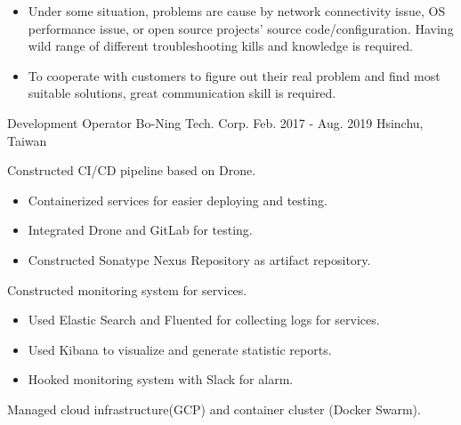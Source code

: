 \begin{cventries}
{\begin{cvitems}
{\begin{itemize}
                            \item Under some situation, problems are cause by network connectivity issue, OS performance issue, or open source projects' source code/configuration. Having wild range of different troubleshooting kills and knowledge is required.
                            \item To cooperate with customers to figure out their real problem and find most suitable solutions, great communication skill is required.
                        \end{itemize}
                    }
            \end{cvitems}
        }

    \cventry
        {Development Operator}
        {Bo-Ning Tech. Corp.}
        {Feb. 2017 - Aug. 2019}
        {Hsinchu, Taiwan}
        {
            \begin{cvitems}
                \item
                    {
                        Constructed CI/CD pipeline based on Drone.
                        \begin{itemize}
                            \item Containerized services for easier deploying and testing.
                            \item Integrated Drone and GitLab for testing.
                            \item Constructed Sonatype Nexus Repository as artifact repository.
                        \end{itemize}
                    }
                \item
                    {
                        Constructed monitoring system for services.
                        \begin{itemize}
                            \item Used Elastic Search and Fluented for collecting logs for services.
                            \item Used Kibana to visualize and generate statistic reports.
                            \item Hooked monitoring system with Slack for alarm.
                        \end{itemize}
                    }
                \item
                    {
                        Managed cloud infrastructure(GCP) and container cluster (Docker Swarm).
                    }
            \end{cvitems}
        }


\end{cventries}
